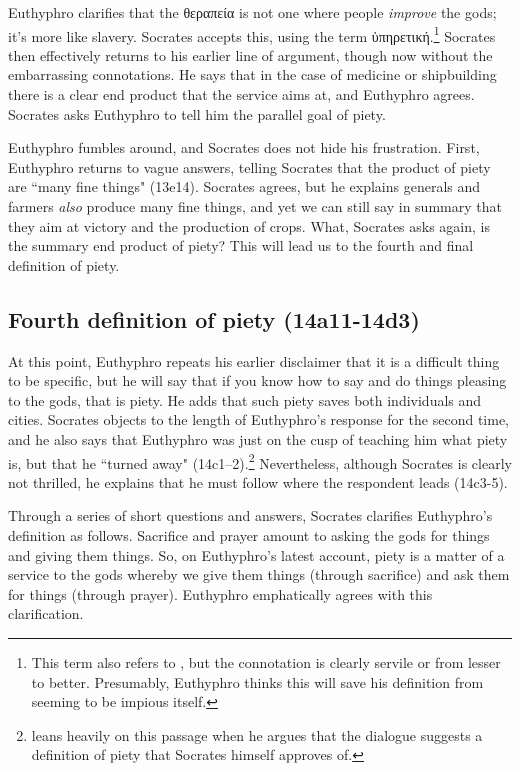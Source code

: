 \documentclass[12pt]{article}
\begin{document}
Euthyphro clarifies that the {\g θεραπεία} is not one where people
\emph{improve} the gods; it's more like slavery.  Socrates accepts this, using
the term {\g ὑπηρετική}.\footnote{This term also refers to , but
the connotation is clearly servile or from lesser to better.  Presumably,
Euthyphro thinks this will save his definition from seeming to be impious
itself.}  Socrates then effectively returns to his earlier line of argument,
though now without the embarrassing connotations.  He says that in the case of
medicine or shipbuilding there is a clear end product that the service aims at,
and Euthyphro agrees.  Socrates asks Euthyphro to tell him the parallel goal of
piety.


Euthyphro fumbles around, and Socrates does not hide his frustration.  First,
Euthyphro returns to vague answers, telling Socrates that the product of piety
are ``many fine things" (13e14).  Socrates agrees, but he explains generals and
farmers \emph{also} produce many fine things, and yet we can still say in
summary that they aim at victory and the production of crops.  What, Socrates
asks again, is the summary end product of piety?  This will lead us to the
fourth and final definition of piety.


\subsection{Fourth definition of piety (14a11-14d3)}

At this point, Euthyphro repeats his earlier disclaimer that it is a difficult
thing to be specific, but he will say that if you know how to say and do things
pleasing to the gods, that is piety.  He adds that such piety saves both
individuals and cities.  Socrates objects to the length of Euthyphro's response
for the second time, and he also says that Euthyphro was just on the cusp of
teaching him what piety is, but that he ``turned away"
(14c1--2).\footnote{\citet{mcpherran1992} leans heavily on this passage when he
argues that the dialogue suggests a definition of piety that Socrates himself
approves of.}  Nevertheless, although Socrates is clearly not thrilled, he
explains that he must follow where the respondent leads (14c3-5).

Through a series of short questions and answers, Socrates clarifies Euthyphro's
definition as follows.  Sacrifice and prayer amount to asking the gods for
things and giving them things.  So, on Euthyphro's latest account, piety is
a matter of a service to the gods whereby we give them things (through
sacrifice) and ask them for things (through prayer).  Euthyphro emphatically
agrees with this clarification.
\end{document}
